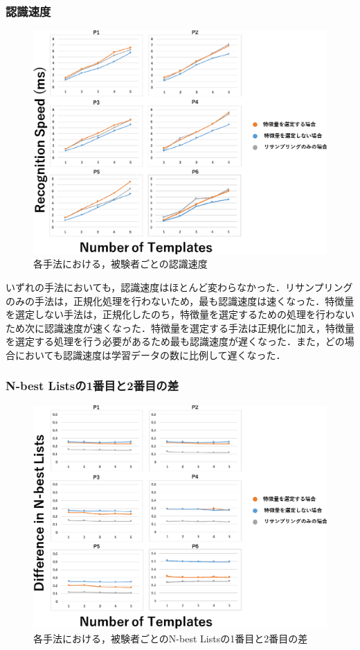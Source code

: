 \subsubsection{認識速度}
\begin{figure}[!h]
\centering
\includegraphics[width=1.0\columnwidth]{img/pre_speed.eps}
\caption{各手法における，被験者ごとの認識速度}
\label{fig:rare_rec}
\end{figure}

いずれの手法においても，認識速度はほとんど変わらなかった．リサンプリングのみの手法は，正規化処理を行わないため，最も認識速度は速くなった．特徴量を選定しない手法は，正規化したのち，特徴量を選定するための処理を行わないため次に認識速度が速くなった．特徴量を選定する手法は正規化に加え，特徴量を選定する処理を行う必要があるため最も認識速度が遅くなった．また，どの場合においても認識速度は学習データの数に比例して遅くなった．

\subsubsection{N-best Listsの1番目と2番目の差}
\begin{figure}[!h]
\centering
\includegraphics[width=1.0\columnwidth]{img/pre_diff.eps}
\caption{各手法における，被験者ごとのN-best Listsの1番目と2番目の差}
\label{fig:rare_rec}
\end{figure}


